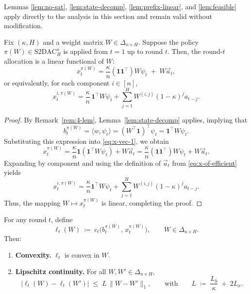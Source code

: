 \begin{Thm:Remark}\label{rem:4-lem}
Lemmas \ref{lem:no-sat}, \ref{lem:state-decomp}, \ref{lem:prefix-linear}, and \ref{lem:feasible} apply directly to the analysis in this section and remain valid without modification.
\end{Thm:Remark}





\begin{Thm:Lemma}\label{lem:prefix-linear-x}
Fix \((\kappa, H)\) and a weight matrix \( W \in \Delta_{n \times H} \).  
Suppose the policy \( \pi(W) \in \mathrm{S2DAC}_H^\kappa \) is applied from \( t = 1 \) up to round \( t \).  
Then, the round-\(t\) allocation is a linear functional of \( W \):
\[
x_t^{\pi(W)} 
=
\frac{\kappa}{n} (\mathbf{1}\mathbf{1}^\top) W \psi_t 
\;+\;
W \vec{a}_t,
\]
or equivalently, for each component \( i \in [n] \),
\[
x_t^{i,\pi(W)} 
=
\frac{\kappa}{n}\,
\mathbf{1}^\top W \psi_t
+
\sum_{j=1}^H W^{(i,j)} (1-\kappa)^j a_{t-j}.
\]
\end{Thm:Lemma}

\begin{proof}
By Remark~\ref{rem:4-lem}, Lemma~\ref{lem:state-decomp} applies, implying that
\[
b_t^{\pi(W)}
= \langle w, \psi_t \rangle
= (W^\top \mathbf{1})^\top \psi_t
= \mathbf{1}^\top W \psi_t.
\]
Substituting this expression into \eqref{eq:x-vec-1}, we obtain
\[
x_t^{\pi(W)} 
= \frac{\kappa}{n} \mathbf{1} (\mathbf{1}^\top W \psi_t) + W \vec{a}_t
= \frac{\kappa}{n} (\mathbf{1}\mathbf{1}^\top) W \psi_t + W \vec{a}_t.
\]
Expanding by component and using the definition of \(\vec{a}_t\) from \eqref{eq:x-of-efficient} yields
\[
x_t^{i,\pi(W)}
= \frac{\kappa}{n} \mathbf{1}^\top W \psi_t
+ \sum_{j=1}^H W^{(i,j)} (1-\kappa)^j a_{t-j}.
\]
Thus, the mapping \( W \mapsto x_t^{\pi(W)} \) is linear, completing the proof.
\end{proof}


\begin{Thm:Lemma}
\label{lem:surrogate-props-W}
For any round \(t\), define
\[
\ell_t(W) \;\coloneqq\; 
c_t\!\bigl(b_t^{\pi(W)},\,x_t^{\pi(W)}\bigr), \qquad W\in\Delta_{n\times H}.
\]
Then:
\begin{enumerate}
    \item \textbf{Convexity.} \(\ell_t\) is convex in \(W\).
    \item \textbf{Lipschitz continuity.} For all \(W,W'\in\Delta_{n\times H}\),
    \[
    \bigl|\ell_t(W)-\ell_t(W')\bigr| \;\le\; L\,\|W-W'\|_1,
    \qquad\text{with}\qquad
    L \;\coloneqq\; \frac{L_b}{\kappa} \;+\; 2L_x.
    \]
\end{enumerate}
\end{Thm:Lemma}

